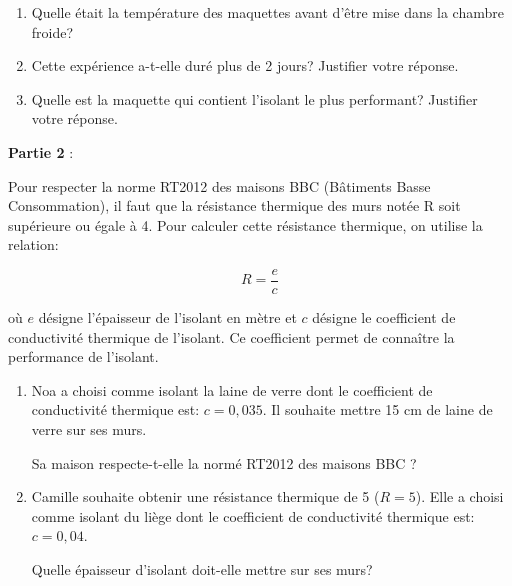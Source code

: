 \medskip

\begin{enumerate}
\item  Quelle était la température des maquettes avant d'être mise dans la chambre froide? 

\item Cette expérience a-t-elle duré plus de 2 jours? Justifier votre réponse. 


\item Quelle est la maquette qui contient l'isolant le plus performant? Justifier votre réponse. 
\end{enumerate}
\medskip


 \textbf{Partie 2 }: 

 Pour respecter la norme RT2012 des maisons BBC (Bâtiments Basse Consommation), il faut que la résistance thermique des murs notée R soit supérieure ou égale à 4. Pour calculer cette résistance thermique, on utilise la relation: 

$$R=\dfrac{e}{c}$$ 

 où $e$ désigne l'épaisseur de l'isolant en mètre et $c$ désigne le coefficient de conductivité thermique de l'isolant. Ce coefficient permet de connaître la performance de l'isolant. 

\begin{enumerate}
\item  Noa a choisi comme isolant la laine de verre dont le coefficient de conductivité thermique est: $c = 0,035$. Il souhaite mettre 15 cm de laine de verre sur ses murs. 

Sa maison respecte-t-elle la normé RT2012 des maisons BBC ? 

\item  Camille souhaite obtenir une résistance thermique de 5 ($R = 5$). Elle a choisi comme isolant du liège dont le coefficient de conductivité thermique est: $c = 0,04$. 

Quelle épaisseur d'isolant doit-elle mettre sur ses murs? 

\end{enumerate}

\vspace{0,5cm}

